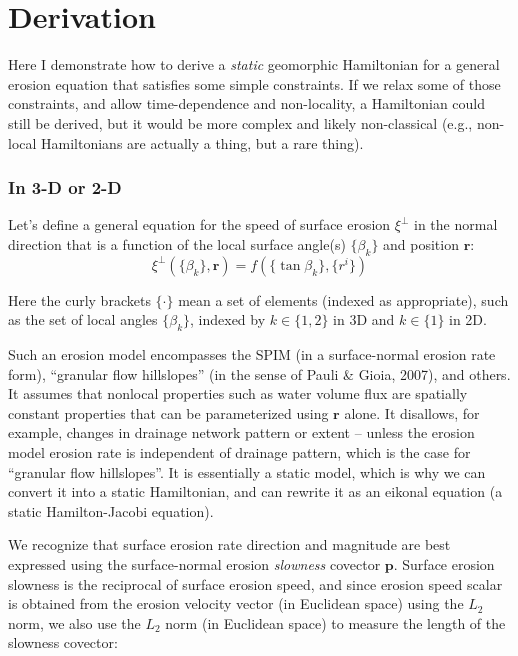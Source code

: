 \documentclass[11pt]{article}
\begin{document}
    \hypertarget{derivation}{%
\section*{Derivation}\label{derivation}}

    Here I demonstrate how to derive a \emph{static} geomorphic Hamiltonian
for a general erosion equation that satisfies some simple constraints.
If we relax some of those constraints, and allow time-dependence and
non-locality, a Hamiltonian could still be derived, but it would be more
complex and likely non-classical (e.g., non-local Hamiltonians are
actually a thing, but a rare thing).

    \hypertarget{in-3-d-or-2-d}{%
\subsubsection*{In 3-D or 2-D}\label{in-3-d-or-2-d}}

    Let's define a general equation for the speed of surface erosion
\(\xi^{\perp}\) in the normal direction that is a function of the local
surface angle(s) \(\{\beta_k\}\) and position \(\mathbf{r}\):
\begin{equation}
    \xi^{\perp}(\{\beta_k\},\mathbf{r}) = f\!\left(\{\tan\beta_k\},\{r^i\}\right)
\end{equation}

Here the curly brackets \(\{\cdot\}\) mean a set of elements (indexed as
appropriate), such as the set of local angles \(\{\beta_k\}\), indexed
by \(k\in\{1,2\}\) in 3D and \(k\in\{1\}\) in 2D.

Such an erosion model encompasses the SPIM (in a surface-normal erosion
rate form), ``granular flow hillslopes'' (in the sense of Pauli \&
Gioia, 2007), and others. It assumes that nonlocal properties such as
water volume flux are spatially constant properties that can be
parameterized using \(\mathbf{r}\) alone. It disallows, for example,
changes in drainage network pattern or extent -- unless the erosion
model erosion rate is independent of drainage pattern, which is the case
for ``granular flow hillslopes''. It is essentially a static model,
which is why we can convert it into a static Hamiltonian, and can
rewrite it as an eikonal equation (a static Hamilton-Jacobi equation).

We recognize that surface erosion rate direction and magnitude are best
expressed using the surface-normal erosion \emph{slowness} covector
\(\mathbf{p}\). Surface erosion slowness is the reciprocal of surface
erosion speed, and since erosion speed scalar is obtained from the
erosion velocity vector (in Euclidean space) using the \(L_2\) norm, we
also use the \(L_2\) norm (in Euclidean space) to measure the length of
the slowness covector:
\end{document}
